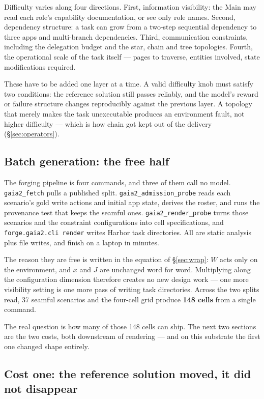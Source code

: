 \documentclass[11pt,a4paper]{article}
\begin{document}
Difficulty varies along four directions. First, information visibility: the Main may read each role's capability documentation, or see only role names. Second, dependency structure: a task can grow from a two-step sequential dependency to three apps and multi-branch dependencies. Third, communication constraints, including the delegation budget and the star, chain and tree topologies. Fourth, the operational scale of the task itself --- pages to traverse, entities involved, state modifications required.

These have to be added one layer at a time. A valid difficulty knob must satisfy two conditions: the reference solution still passes reliably, and the model's reward or failure structure changes reproducibly against the previous layer. A topology that merely makes the task unexecutable produces an environment fault, not higher difficulty --- which is how chain got kept out of the delivery (\S\ref{sec:operators}).

\subsection{Batch generation: the free half}

The forging pipeline is four commands, and three of them call no model. \texttt{gaia2\_fetch} pulls a published split. \texttt{gaia2\_admission\_probe} reads each scenario's gold write actions and initial app state, derives the roster, and runs the provenance test that keeps the seamful ones. \texttt{gaia2\_render\_probe} turns those scenarios and the constraint configurations into cell specifications, and \texttt{forge.gaia2.cli render} writes Harbor task directories. All are static analysis plus file writes, and finish on a laptop in minutes.

The reason they are free is written in the equation of \S\ref{sec:wrap}: $W$ acts only on the environment, and $x$ and $J$ are unchanged word for word. Multiplying along the configuration dimension therefore creates no new design work --- one more visibility setting is one more pass of writing task directories. Across the two splits read, 37 seamful scenarios and the four-cell grid produce \textbf{148 cells} from a single command.

The real question is how many of those 148 cells can ship. The next two sections are the two costs, both downstream of rendering --- and on this substrate the first one changed shape entirely.

\subsection{Cost one: the reference solution moved, it did not disappear}
\label{sec:refcost}
\end{document}
